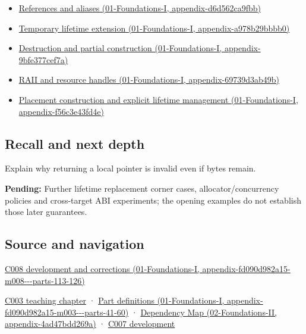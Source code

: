 \begin{itemize}
\item
  \href{../01-Foundations-I/main.pdf\#nameddest=appendix-d6d562ca9fbb}{References and aliases (01-Foundations-I, appendix-d6d562ca9fbb)}
\item
  \href{../01-Foundations-I/main.pdf\#nameddest=appendix-a978b29bbbb0}{Temporary lifetime extension (01-Foundations-I, appendix-a978b29bbbb0)}
\item
  \href{../01-Foundations-I/main.pdf\#nameddest=appendix-9bfe377cef7a}{Destruction and partial construction (01-Foundations-I, appendix-9bfe377cef7a)}
\item
  \href{../01-Foundations-I/main.pdf\#nameddest=appendix-69739d3ab49b}{RAII and resource handles (01-Foundations-I, appendix-69739d3ab49b)}
\item
  \href{../01-Foundations-I/main.pdf\#nameddest=appendix-f56c3e43fd4e}{Placement construction and explicit lifetime management (01-Foundations-I, appendix-f56c3e43fd4e)}
\end{itemize}

\subsection{Recall and next depth}\label{appendix-0b104bcba06b-recall-and-next-depth}

Explain why returning a local pointer is invalid even if bytes remain.

\textbf{Pending:} Further lifetime replacement corner cases, allocator/concurrency policies and cross-target ABI experiments; the opening examples do not establish those later guarantees.

\subsection{Source and navigation}\label{appendix-0b104bcba06b-source-and-navigation}

\href{../01-Foundations-I/main.pdf\#nameddest=appendix-fd090d982a15-m008---parts-113-126}{C008 development and corrections (01-Foundations-I, appendix-fd090d982a15-m008-\/-\/-parts-113-126)}

\hyperref[05-engine-i-ch002-where-the-bytes-live]{C003 teaching chapter} · \href{../01-Foundations-I/main.pdf\#nameddest=appendix-fd090d982a15-m003---parts-41-60}{Part definitions (01-Foundations-I, appendix-fd090d982a15-m003-\/-\/-parts-41-60)} · \href{../02-Foundations-II/main.pdf\#nameddest=appendix-4ad47bdd269a}{Dependency Map (02-Foundations-II, appendix-4ad47bdd269a)} · \hyperref[05-engine-i-ch002-storage-is-a-place-an-object-is-its-occupant]{C007 development}
